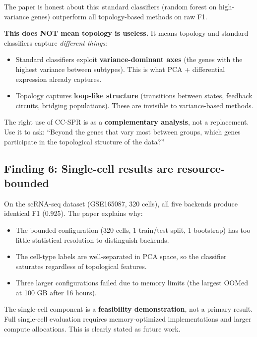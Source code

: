 \documentclass[11pt]{article}
\begin{document}
The paper is honest about this: standard classifiers (random forest on high-variance genes) outperform all topology-based methods on raw F1.

\begin{takeaway}
\textbf{This does NOT mean topology is useless.} It means topology and standard classifiers capture \emph{different things}:
\begin{itemize}
    \item Standard classifiers exploit \textbf{variance-dominant axes} (the genes with the highest variance between subtypes). This is what PCA + differential expression already captures.
    \item Topology captures \textbf{loop-like structure} (transitions between states, feedback circuits, bridging populations). These are invisible to variance-based methods.
\end{itemize}
The right use of CC-SPR is as a \textbf{complementary analysis}, not a replacement. Use it to ask: ``Beyond the genes that vary most between groups, which genes participate in the topological structure of the data?''
\end{takeaway}

\subsection{Finding 6: Single-cell results are resource-bounded}

On the scRNA-seq dataset (GSE165087, 320 cells), all five backends produce identical F1 (0.925). The paper explains why:

\begin{itemize}
    \item The bounded configuration (320 cells, 1 train/test split, 1 bootstrap) has too little statistical resolution to distinguish backends.
    \item The cell-type labels are well-separated in PCA space, so the classifier saturates regardless of topological features.
    \item Three larger configurations failed due to memory limits (the largest OOMed at 100 GB after 16 hours).
\end{itemize}

\begin{takeaway}
The single-cell component is a \textbf{feasibility demonstration}, not a primary result. Full single-cell evaluation requires memory-optimized implementations and larger compute allocations. This is clearly stated as future work.
\end{takeaway}
\end{document}
